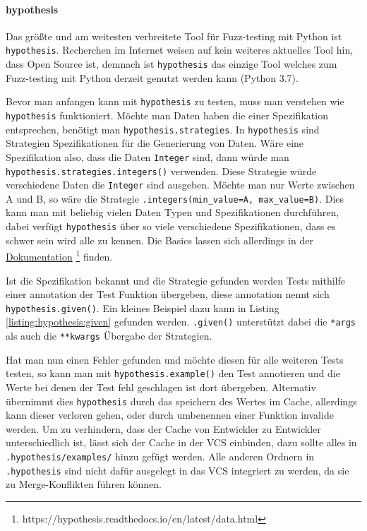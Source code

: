 \paragraph{hypothesis}\label{python-tools:hypothesis}\mbox{}
\newline
Das größte und am weitesten verbreitete Tool für Fuzz-testing mit Python ist
\lstinline{hypothesis}. Recherchen im Internet weisen auf kein weiteres aktuelles
Tool hin, dass Open Source ist, demnach ist \lstinline{hypothesis} das einzige
Tool welches zum Fuzz-testing mit Python derzeit genutzt werden kann (Python 3.7).

Bevor man anfangen kann mit \lstinline{hypothesis} zu testen, muss man verstehen
wie \lstinline{hypothesis} funktioniert. Möchte man Daten haben die einer
Spezifikation entsprechen, benötigt man \lstinline{hypothesis.strategies}. In
\lstinline{hypothesis} sind Strategien Spezifikationen für die Generierung von
Daten. Wäre eine Spezifikation also, dass die Daten \lstinline{Integer} sind, dann
würde man \lstinline{hypothesis.strategies.integers()} verwenden. Diese Strategie
würde verschiedene Daten die \lstinline{Integer} sind ausgeben. Möchte man nur
Werte zwischen A und B, so wäre die Strategie
\lstinline{.integers(min_value=A, max_value=B)}. Dies kann man mit beliebig
vielen Daten Typen und Spezifikationen durchführen, dabei verfügt
\lstinline{hypothesis} über so viele verschiedene Spezifikationen, dass es schwer
sein wird alle zu kennen. Die Basics lassen sich allerdings in der
\href{https://hypothesis.readthedocs.io/en/latest/data.html}{Dokumentation}
\footnote{https://hypothesis.readthedocs.io/en/latest/data.html} finden.

Ist die Spezifikation bekannt und die Strategie gefunden werden Tests mithilfe einer
\Gls{annotation} der Test Funktion übergeben, diese \Gls{annotation} nennt sich
\lstinline{hypothesis.given()}. Ein kleines Beispiel dazu kann in Listing
\ref{listing:hypothesis:given} gefunden werden. \lstinline{.given()} unterstützt
dabei die \lstinline{*args} als auch die \lstinline{**kwargs} Übergabe der Strategien.

Hat man nun einen Fehler gefunden und möchte diesen für alle weiteren Tests testen,
so kann man mit \lstinline{hypothesis.example()} den Test annotieren und die Werte
bei denen der Test fehl geschlagen ist dort übergeben. Alternativ übernimmt dies
\lstinline{hypothesis} durch das speichern des Wertes im Cache, allerdings kann dieser
verloren gehen, oder durch umbenennen einer Funktion invalide werden. Um zu verhindern,
dass der Cache von Entwickler zu Entwickler unterschiedlich ist, lässt sich der Cache
in der VCS einbinden, dazu sollte alles in \lstinline{.hypothesis/examples/} hinzu
gefügt werden. Alle anderen Ordnern in \lstinline{.hypothesis} sind nicht dafür
ausgelegt in das VCS integriert zu werden, da sie zu Merge-Konflikten führen können.

